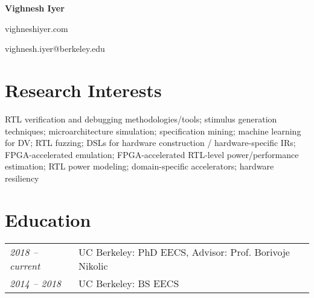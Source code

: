 \documentclass[10pt]{article}
\begin{document}
\begin{center}
    {\LARGE \textbf{Vighnesh Iyer}}

    {\small vighneshiyer.com}

    {\small vighnesh.iyer@berkeley.edu}
\end{center}

\section{Research Interests}
\vspace{-0.1cm}
{RTL verification and debugging methodologies/tools; stimulus generation techniques; microarchitecture simulation; specification mining; machine learning for DV; RTL fuzzing; DSLs for hardware construction / hardware-specific IRs; FPGA-accelerated emulation; FPGA-accelerated RTL-level power/performance estimation; RTL power modeling; domain-specific accelerators; hardware resiliency}
\vspace{-0.2cm}

\section{Education}
\vspace{-0.1cm}
\begin{tabular}{@{}ll}
    \textit{2018 -- current} & UC Berkeley: PhD EECS, Advisor: Prof. Borivoje Nikolic\\
    \textit{2014 -- 2018} & UC Berkeley: BS EECS
\end{tabular}
\vspace{-0.2cm}
\end{document}

